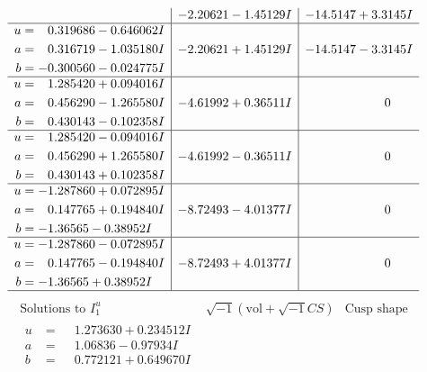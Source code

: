\documentclass[1p]{elsarticle_modified}
\theoremstyle{definition}
\newcommand{\I}{\sqrt{-1}}
\begin{document}
$$\begin{array}{c|c|c}
 & -2.20621 - 1.45129 I & -14.5147 + 3.3145 I \\ \hline\begin{aligned}
u &= \phantom{-}0.319686 - 0.646062 I \\
a &= \phantom{-}0.316719 - 1.035180 I \\
b &= -0.300560 - 0.024775 I\end{aligned}
 & -2.20621 + 1.45129 I & -14.5147 - 3.3145 I \\ \hline\begin{aligned}
u &= \phantom{-}1.285420 + 0.094016 I \\
a &= \phantom{-}0.456290 - 1.265580 I \\
b &= \phantom{-}0.430143 - 0.102358 I\end{aligned}
 & -4.61992 + 0.36511 I & \phantom{-0.000000 } 0 \\ \hline\begin{aligned}
u &= \phantom{-}1.285420 - 0.094016 I \\
a &= \phantom{-}0.456290 + 1.265580 I \\
b &= \phantom{-}0.430143 + 0.102358 I\end{aligned}
 & -4.61992 - 0.36511 I & \phantom{-0.000000 } 0 \\ \hline\begin{aligned}
u &= -1.287860 + 0.072895 I \\
a &= \phantom{-}0.147765 + 0.194840 I \\
b &= -1.36565 - 0.38952 I\end{aligned}
 & -8.72493 - 4.01377 I & \phantom{-0.000000 } 0 \\ \hline\begin{aligned}
u &= -1.287860 - 0.072895 I \\
a &= \phantom{-}0.147765 - 0.194840 I \\
b &= -1.36565 + 0.38952 I\end{aligned}
 & -8.72493 + 4.01377 I & \phantom{-0.000000 } 0\\
 \hline 
 \end{array}$$\newpage$$\begin{array}{c|c|c}  
\text{Solutions to }I^u_{1}& \I (\text{vol} + \sqrt{-1}CS) & \text{Cusp shape}\\
 \hline 
\begin{aligned}
u &= \phantom{-}1.273630 + 0.234512 I \\
a &= \phantom{-}1.06836 - 0.97934 I \\
b &= \phantom{-}0.772121 + 0.649670 I\end{aligned}

\end{array}$$
\end{document}
